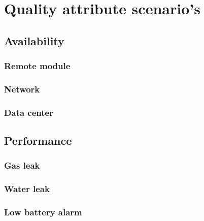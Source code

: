 \chapter{Quality attribute scenario's}
\label{quality-attribute-scenarios}

\section{Availability}

\subsection{Remote module}
\label{qas-av-module}


\newpage
\subsection{Network}
\label{qas-av-network}


\newpage
\subsection{Data center}
\label{qas-av-datacenter}


\newpage
\section{Performance}
\subsection{Gas leak}
\label{qas-perf-gas}


\newpage
\subsection{Water leak}
\label{qas-perf-water}


\newpage
\subsection{Low battery alarm}
\label{qas-perf-low-battery}
